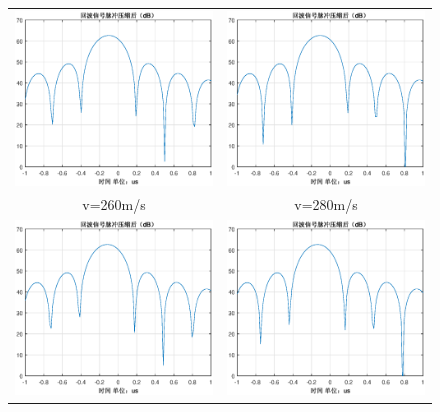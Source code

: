 \documentclass[12pt]{article}
\begin{document}
\begin{figure}[htbp]
  \centering
  \begin{tabular}{cc}
    \includegraphics[width=.5\textwidth]{Doppler_sensitivity_0260}&\includegraphics[width=.5\textwidth]{Doppler_sensitivity_0280}\\
    v=260m/s&v=280m/s\\
    \includegraphics[width=.5\textwidth]{Doppler_sensitivity_0300}&\includegraphics[width=.5\textwidth]{Doppler_sensitivity_0350}\\

\end{tabular}
\end{figure}
\end{document}
